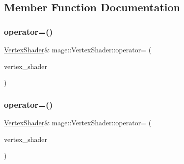 \subsection{Member Function Documentation}
\hypertarget{classmage_1_1_vertex_shader_a0094f5c2adb8377fa5c8d52e7a65136f}{}\label{classmage_1_1_vertex_shader_a0094f5c2adb8377fa5c8d52e7a65136f} 
\subsubsection{\texorpdfstring{operator=()}{operator=()}\hspace{0.1cm}{\footnotesize\ttfamily [1/2]}}
{\footnotesize\ttfamily \hyperlink{classmage_1_1_vertex_shader}{Vertex\+Shader}\& mage\+::\+Vertex\+Shader\+::operator= (\begin{DoxyParamCaption}\item[{const \hyperlink{classmage_1_1_vertex_shader}{Vertex\+Shader} \&}]{vertex\+\_\+shader }\end{DoxyParamCaption})\hspace{0.3cm}{\ttfamily [delete]}}

\hypertarget{classmage_1_1_vertex_shader_ada6250a89610e5649e0062c9a50fb78a}{}\label{classmage_1_1_vertex_shader_ada6250a89610e5649e0062c9a50fb78a} 
\subsubsection{\texorpdfstring{operator=()}{operator=()}\hspace{0.1cm}{\footnotesize\ttfamily [2/2]}}
{\footnotesize\ttfamily \hyperlink{classmage_1_1_vertex_shader}{Vertex\+Shader}\& mage\+::\+Vertex\+Shader\+::operator= (\begin{DoxyParamCaption}\item[{\hyperlink{classmage_1_1_vertex_shader}{Vertex\+Shader} \&\&}]{vertex\+\_\+shader }\end{DoxyParamCaption})\hspace{0.3cm}{\ttfamily [delete]}}

\hypertarget{classmage_1_1_vertex_shader_a928e013248cf9c7cf17923bd6ff6a3e6}{}\label{classmage_1_1_vertex_shader_a928e013248cf9c7cf17923bd6ff6a3e6} 
